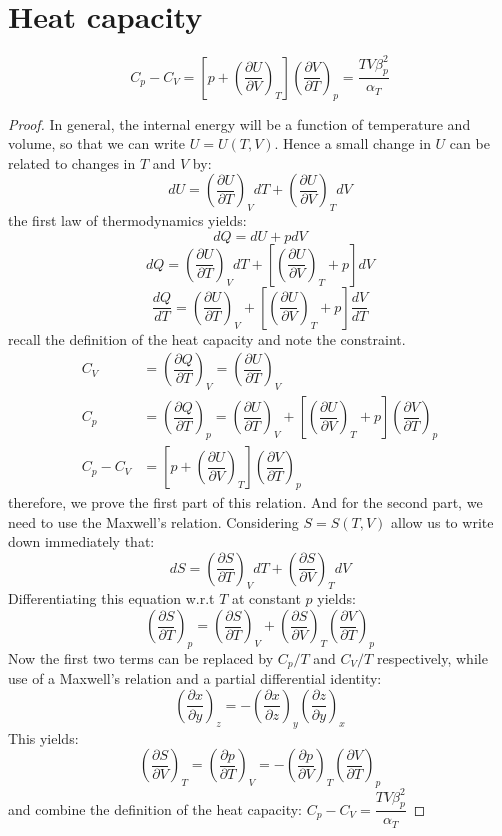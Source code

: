\documentclass[UTF8]{book}
\begin{document}
\section{Heat capacity}
$$C_p-C_V=\left[p+\left(\dfrac{\partial U}{\partial V}\right)_T\right]\left(\dfrac{\partial V}{\partial T}\right)_p=\dfrac{TV\beta _p^2}{\alpha _T }$$
\begin{proof}
 {In general, the internal energy will be a function of temperature and volume, so that we can write $U=U(T,V)$. Hence a small change in $U$ can be related to changes in $T$ and $V$ by:}
$$dU=\left(\dfrac{\partial U}{\partial T}\right)_VdT+\left(\dfrac{\partial U}{\partial V}\right)_TdV$$
 {the first law of thermodynamics yields:}
$$dQ=dU+pdV$$
$$dQ=\left(\dfrac{\partial U}{\partial T}\right)_VdT+\left[\left(\dfrac{\partial U}{\partial V}\right)_T+p\right]dV$$
$$\dfrac{dQ}{dT}=\left(\dfrac{\partial U}{\partial T}\right)_V+\left[\left(\dfrac{\partial U}{\partial V}\right)_T+p\right]\dfrac{dV}{dT}$$
 {recall the definition of the heat capacity and note the constraint.}
\begin{align*}
C_V&=\left(\dfrac{\partial Q}{\partial T}\right)_V=\left(\dfrac{\partial U}{\partial T}\right)_V\\
C_p&=\left(\dfrac{\partial Q}{\partial T}\right)_p=\left(\dfrac{\partial U}{\partial T}\right)_V+\left[\left(\dfrac{\partial U}{\partial V}\right)_T+p\right]\left(\dfrac{\partial V}{\partial T}\right)_p\\
C_p-C_V&=\left[p+\left(\dfrac{\partial U}{\partial V}\right)_T\right]\left(\dfrac{\partial V}{\partial T}\right)_p
\end{align*}
 {therefore, we prove the first part of this relation. And for the second part, we need to use the Maxwell's relation. Considering $S=S(T,V)$ allow us to write down immediately that:}
$$dS=\left(\dfrac{\partial S}{\partial T}\right)_VdT+\left(\dfrac{\partial S}{\partial V}\right)_TdV$$
 {Differentiating this equation w.r.t $T$ at constant $p$ yields:}
$$\left(\dfrac{\partial S}{\partial T}\right)_p=\left(\dfrac{\partial S}{\partial T}\right)_V+\left(\dfrac{\partial S}{\partial V}\right)_T\left(\dfrac{\partial V}{\partial T}\right)_p$$
 {Now the first two terms can be replaced by $C_p/T$ and $C_V/T$ respectively, while use of a Maxwell's relation and a partial differential identity:}
$$\left(\dfrac{\partial x}{\partial y}\right)_z=-\left(\dfrac{\partial x}{\partial z}\right)_y\left(\dfrac{\partial z}{\partial y}\right)_x$$
 {This yields:}
$$\left(\dfrac{\partial S}{\partial V}\right)_T=\left(\dfrac{\partial p}{\partial T}\right)_V=-\left(\dfrac{\partial p}{\partial V}\right)_T\left(\dfrac{\partial V}{\partial T}\right)_p$$
 {and combine the definition of the heat capacity:}
$C_p-C_V=\dfrac{TV\beta _p^2}{\alpha _T }$
\end{proof}
\end{document}
